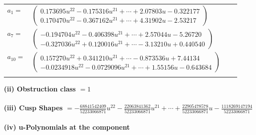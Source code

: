 \documentclass[1p]{elsarticle_modified}
\theoremstyle{definition}
\begin{document}
\begin{tabular}{m{7pt} m{180pt} m{7pt} m{180pt} }
\flushright $a_{1}=$&$\begin{pmatrix}0.173695 u^{22}-0.175316 u^{21}+\cdots+2.07803 u-0.322177\\0.170470 u^{22}-0.367162 u^{21}+\cdots+4.31902 u-2.53217\end{pmatrix}$ \\
\flushright $a_{7}=$&$\begin{pmatrix}-0.194704 u^{22}-0.406398 u^{21}+\cdots+2.57044 u-5.26720\\-0.327036 u^{22}+0.120016 u^{21}+\cdots-3.13210 u+0.440540\end{pmatrix}$ \\
\flushright $a_{10}=$&$\begin{pmatrix}0.157270 u^{22}+0.341210 u^{21}+\cdots-0.873536 u+7.44134\\-0.0234918 u^{22}-0.0729096 u^{21}+\cdots+1.55156 u-0.643684\end{pmatrix}$\\&\end{tabular}
\flushleft \textbf{(ii) Obstruction class $= 1$}\\~\\
\flushleft \textbf{(iii) Cusp Shapes $= -\frac{68841542409}{52233066871} u^{22}-\frac{22063841362}{52233066871} u^{21}+\cdots+\frac{22905478578}{52233066871} u-\frac{1118269147194}{52233066871}$}\\~\\
\newpage\renewcommand{\arraystretch}{1}
\flushleft \textbf{(iv) u-Polynomials at the component}\newline \\
\end{document}
